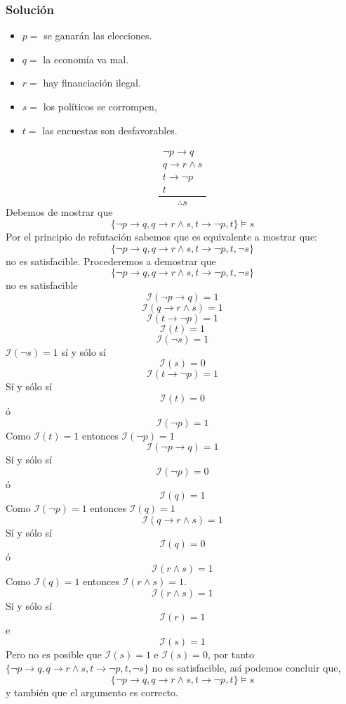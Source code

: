 \documentclass[a4paper]{article}
\begin{document}
\subsubsection*{Solución}
\begin{itemize}
    \item $p = $ se ganarán las elecciones.
    \item $q = $ la economía va mal.
    \item $r = $ hay financiación ilegal.
    \item $s = $ los políticos se corrompen,
    \item $t = $ las encuestas son desfavorables.
\end{itemize}
\[
    \frac{\begin{matrix}
        \neg p \rightarrow q \\
        q \rightarrow r \land s \\
        t \rightarrow \neg p \\
        t
    \end{matrix}}{\therefore s}
\]
Debemos de mostrar que 
\[
    \{ \neg p \rightarrow q, q \rightarrow r \land s, t \rightarrow \neg p, t\} \models s
\]
Por el principio de refutación sabemos que es equivalente a mostrar que:
\[
    \{ \neg p \rightarrow q, q \rightarrow r \land s, t \rightarrow \neg p, t, \neg s\}
\]
no es satisfacible.
\newline
Procederemos a demostrar que 
\[
    \{ \neg p \rightarrow q, q \rightarrow r \land s, t \rightarrow \neg p, t, \neg s\}
\]
no es satisfacible
\[
    \mathcal{I}(\neg p \rightarrow q) = 1
\]
\[
    \mathcal{I}(q \rightarrow r \land s) = 1
\]
\[
    \mathcal{I}(t \rightarrow \neg p) = 1
\]
\[
    \mathcal{I}(t) = 1
\]
\[
    \mathcal{I}(\neg s) = 1
\]
$\mathcal{I}(\neg s) = 1$ sí y sólo sí
\[
    \mathcal{I}(s) = 0
\]
\[
    \mathcal{I}(t \rightarrow \neg p) = 1
\]
Sí y sólo sí 
\[
    \mathcal{I}(t) = 0
\]
ó
\[
    \mathcal{I}(\neg p) = 1
\]
Como $\mathcal{I}(t) = 1$ entonces $\mathcal{I}(\neg p) = 1$
\[
    \mathcal{I}(\neg p \rightarrow q) = 1
\]
Sí y sólo sí
\[
    \mathcal{I}(\neg p) = 0
\]
ó
\[
    \mathcal{I}(q) = 1
\]
Como $\mathcal{I}(\neg p) = 1$ entonces $\mathcal{I}(q) = 1$
\[
    \mathcal{I}(q \rightarrow r \land s) = 1
\]
Sí y sólo sí
\[
    \mathcal{I}(q) = 0
\]
ó
\[
    \mathcal{I}(r \land s) = 1
\]
Como $\mathcal{I}(q) = 1$ entonces $\mathcal{I}(r \land s) = 1$. 
\[
    \mathcal{I}(r \land s) = 1
\]
Sí y sólo sí
\[
    \mathcal{I}(r) = 1
\]
e
\[
\mathcal{I}(s) = 1
\]
Pero no es posible que $\mathcal{I}(s) = 1$ e $\mathcal{I}(s) = 0$, por tanto $\{ \neg p \rightarrow q, q \rightarrow r \land s, t \rightarrow \neg p, t, \neg s\}$ no es satisfacible, así podemos concluir que,  
\[
    \{ \neg p \rightarrow q, q \rightarrow r \land s, t \rightarrow \neg p, t\} \models s
\]
y también que el argumento es correcto.
\end{document}
